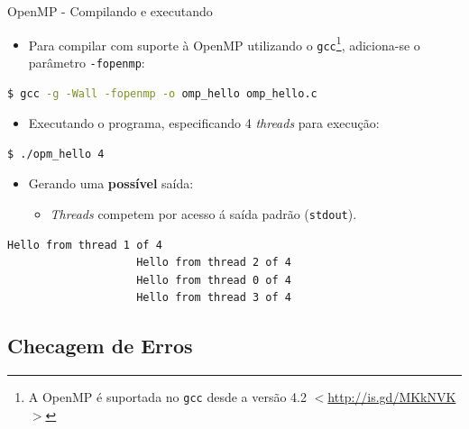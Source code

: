 \begin{frame}[fragile]{OpenMP - Compilando e executando}
	\begin{itemize}
		\item Para compilar com suporte à OpenMP utilizando o \texttt{gcc}\footnote{A OpenMP é suportada no \texttt{gcc} desde a versão 4.2 $<$\url{http://is.gd/MKkNVK}$>$}, adiciona-se o parâmetro \texttt{-fopenmp}:
	\end{itemize}
	\begin{adjustwidth}{-1.6cm}{}
	\fontsize{9pt}{7.2}\selectfont
	\begin{lstlisting}[language=bash]
				$ gcc -g -Wall -fopenmp -o omp_hello omp_hello.c
	\end{lstlisting}
	\fontsize{10pt}{7.2}\selectfont
	\end{adjustwidth}
	\pause
	\begin{itemize}
		\item Executando o programa, especificando 4 \textit{threads} para execução:
	\end{itemize}
	\begin{adjustwidth}{-1.6cm}{}
	\fontsize{9pt}{7.2}\selectfont
	\begin{lstlisting}[language=bash]
				$ ./opm_hello 4
	\end{lstlisting}
	\fontsize{10pt}{7.2}\selectfont
	\end{adjustwidth}
	\pause
	\begin{itemize}
		\item Gerando uma \textbf{possível} saída:
		\medskip
		\begin{itemize}
			\item \textit{Threads} competem por acesso á saída padrão (\texttt{stdout}).
		\end{itemize}
	\end{itemize}
		\begin{adjustwidth}{-1.6cm}{}
			\fontsize{9pt}{7.2}\selectfont
			\begin{lstlisting}[language=bash]
					Hello from thread 1 of 4
					Hello from thread 2 of 4
					Hello from thread 0 of 4
					Hello from thread 3 of 4
			\end{lstlisting}
			\fontsize{10pt}{7.2}\selectfont
		\end{adjustwidth}
\end{frame}

\subsection{Checagem de Erros}

